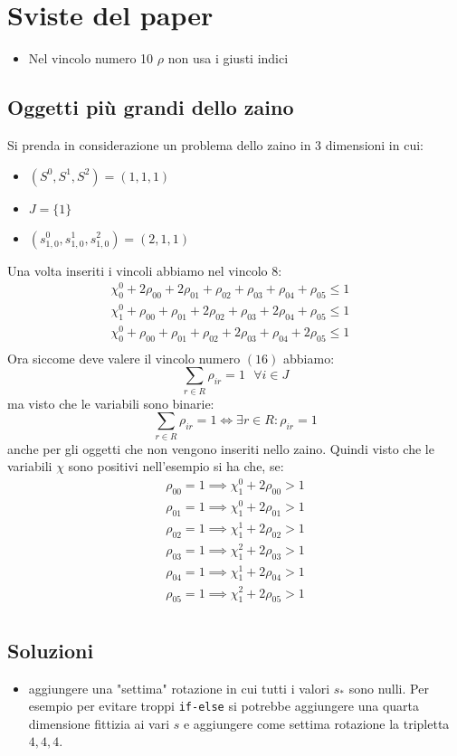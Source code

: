 \documentclass{scrartcl}
\begin{document}
\section{Sviste del paper}
\begin{itemize}
	\item Nel vincolo numero 10 $\rho$ non usa i giusti indici
\end{itemize}

\subsection{Oggetti più grandi dello zaino}
Si prenda in considerazione un problema dello zaino in 3 dimensioni in cui:
\begin{itemize}
	\item $(S^0,S^1,S^2) = (1,1,1)$
	\item $J = \{1\}$
	\item $(s_{1, 0}^0,s_{1,0}^1, s_{1,0}^2) = (2,1,1)$
\end{itemize}
Una volta inseriti i vincoli abbiamo nel vincolo 8:
$$
\begin{array}{ll}
\chi_0^0 + 2 \rho_{00} + 2 \rho_{01} + \rho_{02} + \rho_{03} + \rho_{04} + \rho_{05} \leq 1 & \\
\chi_1^0 +  \rho_{00} +  \rho_{01} + 2 \rho_{02} + \rho_{03} + 2 \rho_{04} + \rho_{05} \leq 1 & \\
\chi_0^0 +  \rho_{00} +  \rho_{01} + \rho_{02} + 2 \rho_{03} + \rho_{04} + 2 \rho_{05} \leq 1 & \\
\end{array}
$$
Ora siccome deve valere il vincolo numero $(16)$ abbiamo:
$$
\sum_{r\in R} \rho_{ir} = 1 \ \ \ \forall i \in J
$$
ma visto che le variabili sono binarie:
$$
\sum_{r\in R} \rho_{ir} = 1 \iff \exists r \in R : \rho_{ir} = 1
$$
anche per gli oggetti che non vengono inseriti nello zaino.
Quindi visto che le variabili $\chi$ sono positivi nell'esempio si ha che, se:
$$
\begin{array}{l}
\rho_{00} = 1 \implies \chi_1^0 + 2 \rho_{00} > 1 \\
\rho_{01} = 1 \implies \chi_1^0 + 2 \rho_{01} > 1 \\
\rho_{02} = 1 \implies \chi_1^1 + 2 \rho_{02} > 1 \\
\rho_{03} = 1 \implies \chi_1^2 + 2 \rho_{03} > 1 \\
\rho_{04} = 1 \implies \chi_1^1 + 2 \rho_{04} > 1 \\
\rho_{05} = 1 \implies \chi_1^2 + 2 \rho_{05} > 1 \\
\end{array}
$$

\subsection{Soluzioni}
\begin{itemize}
	\item aggiungere una "settima" rotazione in cui tutti i valori $s_*$ sono nulli.
	Per esempio per evitare troppi \verb|if-else| si potrebbe aggiungere una quarta dimensione fittizia ai vari $s$ e aggiungere come settima rotazione la tripletta ${4,4,4}$.
	
\end{itemize}
\end{document}
